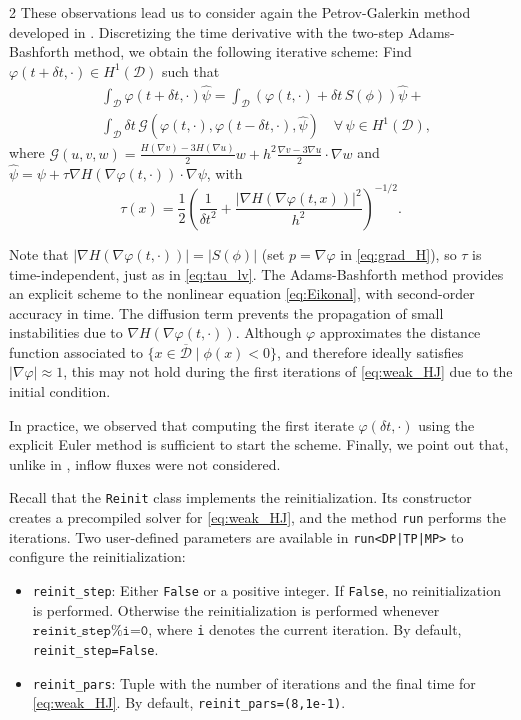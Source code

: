 \documentclass[a4paper, oneside]{article}
\newcommand{\code}[1]{\texttt{#1}}
\begin{document}
\begin{multicols}{2}
These observations lead us to consider again
the Petrov-Galerkin method developed in \cite{MR1640142}. 
Discretizing the time derivative with the two-step Adams-Bashforth method,
we obtain the following iterative scheme:
Find $\varphi(t + \delta t, \cdot) \in H^1(\mathcal{D})$ such that
\begin{align} \label{eq:weak_HJ}
	& \int_{\mathcal{D}}  \varphi(t + \delta t, \cdot) \hat{\psi} = \int_{\mathcal{D}} (\varphi(t, \cdot) + {\delta t} \, S(\phi)) \hat{\psi} + {}\nonumber \\
	& \int_{\mathcal{D}} {\delta t}\,\mathcal{G}(\varphi(t, \cdot), \varphi(t - \delta t, \cdot), \hat{\psi}) \quad \forall \, \psi\in H^1(\mathcal{D}),
\end{align}
where $\mathcal{G}(u, v, w) = \tfrac{H(\nabla v)-3H(\nabla u)}{2} w + h^2 \tfrac{\nabla v - 3\nabla u}{2} \cdot \nabla w$
and $\hat{\psi}=\psi+\tau\nabla H(\nabla \varphi(t, \cdot)) \cdot\nabla\psi $, with 
\begin{equation}
	\tau(x) = \frac{1}{2}\left(\frac{1}{\delta t^2}  + \frac{|\nabla H(\nabla \varphi(t, x))|^2}{h^2}\right)^{-1/2}.
\end{equation}

Note that $|\nabla H(\nabla \varphi(t, \cdot))| = \left|S(\phi)\right|$ (set $p=\nabla \varphi$ in \eqref{eq:grad_H}),
so $\tau$ is time-independent, just as in \eqref{eq:tau_lv}.
The Adams-Bashforth method provides an explicit scheme
to the nonlinear equation \eqref{eq:Eikonal},
with second-order accuracy in time.
The diffusion term prevents the propagation of
small instabilities due to $\nabla H(\nabla \varphi (t, \cdot))$.
Although $\varphi$ approximates the distance function
associated to $\{x\in\overline{\mathcal{D}} \mid \phi(x)<0\}$, and
therefore ideally satisfies $\left|\nabla \varphi\right| \approx 1$,
this may not hold during the first iterations of \eqref{eq:weak_HJ}
due to the initial condition.

In practice, we observed that computing
the first iterate $\varphi(\delta t, \cdot)$
using the explicit Euler method is sufficient to start the scheme.
Finally, we point out that, unlike in \cite{MR1640142}, inflow fluxes were not considered.

Recall that the \code{Reinit} class implements the reinitialization.
Its constructor creates a precompiled solver for \eqref{eq:weak_HJ},
and the method \code{run} performs the iterations.
Two user-defined parameters are available in \code{run<DP|TP|MP>}
to configure the reinitialization:
\begin{itemize}[left=0.0em]
	\item \code{reinit\_step}:
	Either \code{False} or a positive integer.
	If \code{False}, no reinitialization is performed. Otherwise
	the reinitialization is performed whenever $\code{reinit\_step\%i=0}$, where
	\code{i} denotes the current iteration. By default, \code{reinit\_step=False}.
	\item \code{reinit\_pars}:
	Tuple with the number of iterations and the final time for \eqref{eq:weak_HJ}.
	By default, \code{reinit\_pars=(8,1e-1)}.
\end{itemize}


\end{multicols}
\end{document}
